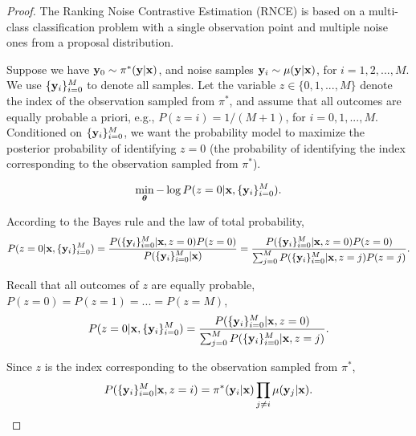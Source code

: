 \begin{proof}
The Ranking Noise Contrastive Estimation (RNCE) is based on a multi-class classification problem with a single observation point and multiple noise ones from a proposal distribution.

Suppose we have $\mathbf{y}_0 \sim \pi^{\ast}(\mathbf{y} | \mathbf{x})$,
and noise samples $\mathbf{y}_i \sim \mu(\mathbf{y} | \mathbf{x})$, for $i = 1,2,...,M$.
We use $\{ \mathbf{y}_i \}_{i=0}^M$ to denote all samples.
Let the variable $z \in \{0, 1, ..., M \}$ denote the index of the observation sampled from $\pi^{\ast}$,
and assume that all outcomes are equally probable a priori,
e.g.,
$P(z=i) = 1 / (M + 1)$, for $i = 0, 1,...,M$.
Conditioned on $\{ \mathbf{y}_i \}_{i=0}^M$, we want the probability model to maximize the posterior probability of identifying $z = 0$ (the probability of identifying the index corresponding to the observation sampled from $\pi^{\ast}$).

\begin{equation*}
\min \limits_{\boldsymbol\theta}
- \log P(z = 0 | \mathbf{x}, \{ \mathbf{y}_i \}_{i=0}^M).
\end{equation*}

According to the Bayes rule and the law of total probability,
\begin{equation*}
P(z = 0 | \mathbf{x}, \{ \mathbf{y}_i \}_{i=0}^M)
=
\frac{P(\{ \mathbf{y}_i \}_{i=0}^M | \mathbf{x}, z = 0) P(z = 0)}
{P(\{ \mathbf{y}_i \}_{i=0}^M | \mathbf{x})}
=
\frac{P(\{ \mathbf{y}_i \}_{i=0}^M | \mathbf{x}, z = 0) P(z = 0)}
{\sum_{j=0}^M P(\{ \mathbf{y}_i \}_{i=0}^M | \mathbf{x}, z = j) P(z = j)}.
\end{equation*}

Recall that all outcomes of $z$ are equally probable,
$P(z=0) = P(z=1) = ... = P(z=M)$,
\begin{equation*}
P(z = 0 | \mathbf{x}, \{ \mathbf{y}_i \}_{i=0}^M)
=
\frac{P(\{ \mathbf{y}_i \}_{i=0}^M | \mathbf{x}, z = 0)}
{\sum_{j=0}^M P(\{ \mathbf{y}_i \}_{i=0}^M | \mathbf{x}, z = j)}.
\end{equation*}

Since $z$ is the index corresponding to the observation sampled from $\pi^{\ast}$,
\begin{equation*}
P(\{ \mathbf{y}_i \}_{i=0}^M | \mathbf{x}, z = i)
=
\pi^{\ast}(\mathbf{y}_i | \mathbf{x})
\prod_{j \neq i}
\mu(\mathbf{y}_j | \mathbf{x}).
\end{equation*}


\end{proof}
